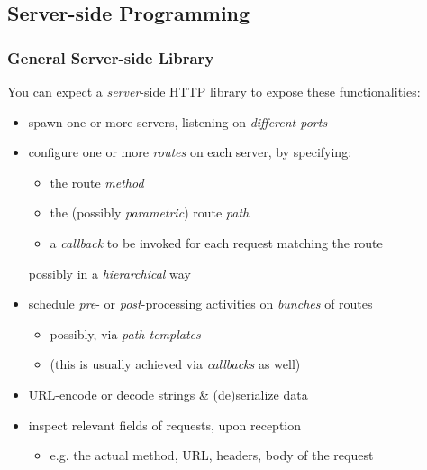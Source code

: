 \documentclass[presentation]{beamer}\mode<presentation>{\usetheme{AMSCesenaPurpleAndGold}}
\begin{document}
\subsection{Server-side Programming}

\begin{frame}%
\frametitle{General Server-side Library}

    You can expect a \emph{server}-side HTTP library to expose these functionalities:
    \begin{itemize}
        \item spawn one or more servers, listening on \emph{different ports}

        \vfill

        \item configure one or more \emph{routes} on each server, by specifying:
        \begin{itemize}
            \item the route \emph{method}
            \item the (possibly \emph{parametric}) route \emph{path}
            \item a \emph{callback} to be invoked for each request matching the route
        \end{itemize}
        possibly in a \emph{hierarchical} way

        \vfill

        \item schedule \emph{pre}- or \emph{post}-processing activities on \emph{bunches} of routes
        \begin{itemize}
            \item possibly, via \emph{path templates}
            \item (this is usually achieved via \emph{callbacks} as well)
        \end{itemize}

        \vfill

        \item URL-encode or decode strings \& (de)serialize data

        \vfill

        \item inspect relevant fields of requests, upon reception
        \begin{itemize}
            \item e.g. the actual method, URL, headers, body of the request
        \end{itemize}


\end{itemize}
\end{frame}
\end{document}
